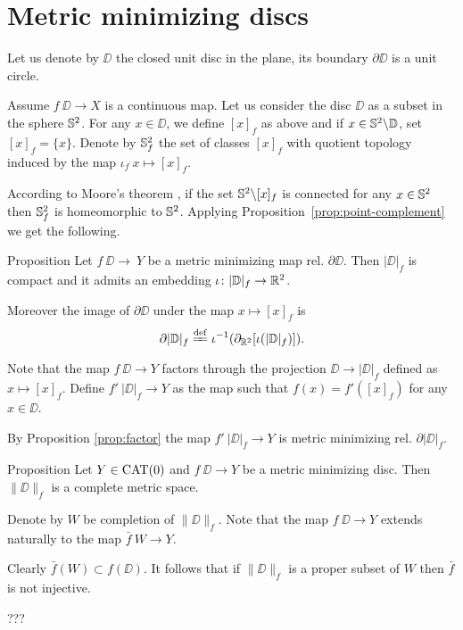 \documentclass[a4paper,10pt]{amsart}
\begin{document}
\section{Metric minimizing discs}



Let us denote by $\DD$ the closed unit disc in the plane,
its boundary $\partial \DD$ is a unit circle.

Assume $f\:\DD\to X$ is a continuous map.
Let us consider the disc $\DD$ as a subset in the sphere $\mathbb{S}^2$.
For any $x\in \DD$, we define $[x]_f$ as above
and 
if $x\in \mathbb{S}^2\backslash \mathbb{D}$, set $[x]_f=\{x\}$.
Denote by $\mathbb{S}^2_f$ the set of classes $[x]_f$ with quotient topology induced by the map $\iota_f\:x\mapsto [x]_f$.

According to Moore's theorem \cite{moore},
if the set $\mathbb{S}^2\backslash[x]_f$ is connected for any $x\in \mathbb{S}^2$
then $\mathbb{S}^2_f$ is homeomorphic to $\mathbb{S}^2$.
Applying Proposition~\ref{prop:point-complement} we get the following.

\begin{thm}{Proposition}
Let $f\:\DD\to\ Y$ be a metric minimizing map rel. $\partial \DD$.
Then $|\DD|_f$ is compact and it admits an embedding $\iota\colon|\mathbb{D}|_f\to \mathbb{R}^2$.

Moreover the image of $\partial \DD$
under the map $x\mapsto [x]_f$
is 
\[\partial|\DD|_f\df\iota^{-1}(\partial_{\RR^2}[\iota(|\DD|_f)]).\]

\end{thm}

Note that the map $f\:\DD\to Y$ factors through the projection 
$\DD\to|\DD|_f$ defined as $x\mapsto[x]_f$.
Define $f'\:|\DD|_f\to Y$ as the map such that $f(x)=f'([x]_f)$ for any $x\in\DD$.

By Proposition \ref{prop:factor} the map $f'\:|\DD|_f\to Y$
is metric minimizing rel. $\partial|\DD|_f$.

\begin{thm}{Proposition}
Let $Y\in\mathop{\rm CAT}\nolimits(0)$ 
and 
$f\:\DD\to Y$ be a metric minimizing disc.
Then $\|\DD\|_f$ is a complete metric space.
\end{thm}

Denote by $W$ be completion of $\|\DD\|_f$.
Note that the map $f\:\DD\to Y$ extends naturally to the map $\bar f\:W\to Y$.

Clearly $\bar f(W)\subset f(\DD)$. 
It follows that if $\|\DD\|_f$ is a proper subset of $W$
then $\bar f$ is not injective.

???
\qeds
\end{document}
